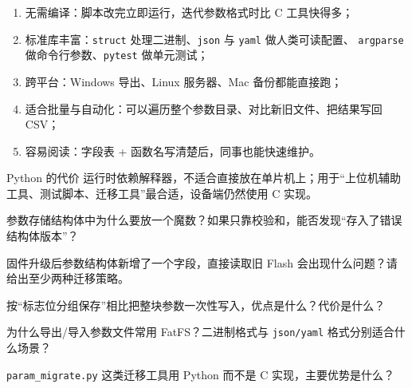\begin{enumerate}
\item 无需编译：脚本改完立即运行，迭代参数格式时比 C 工具快得多；
\item 标准库丰富：\texttt{struct} 处理二进制、\texttt{json} 与 \texttt{yaml} 做人类可读配置、 \texttt{argparse} 做命令行参数、\texttt{pytest} 做单元测试；
\item 跨平台：Windows 导出、Linux 服务器、Mac 备份都能直接跑；
\item 适合批量与自动化：可以遍历整个参数目录、对比新旧文件、把结果写回 CSV；
\item 容易阅读：字段表 + 函数名写清楚后，同事也能快速维护。
\end{enumerate}

\begin{anybox}{Python 的代价}
运行时依赖解释器，不适合直接放在单片机上；用于“上位机辅助工具、测试脚本、迁移工具”最合适，设备端仍然使用 C 实现。

\end{anybox}

\begin{problemset}
\item 参数存储结构体中为什么要放一个魔数？如果只靠校验和，能否发现“存入了错误结构体版本”？
\item 固件升级后参数结构体新增了一个字段，直接读取旧 Flash 会出现什么问题？请给出至少两种迁移策略。
\item 按“标志位分组保存”相比把整块参数一次性写入，优点是什么？代价是什么？
\item 为什么导出/导入参数文件常用 FatFS？二进制格式与 \texttt{json/yaml} 格式分别适合什么场景？
\item \texttt{param\_migrate.py} 这类迁移工具用 Python 而不是 C 实现，主要优势是什么？
\end{problemset}
